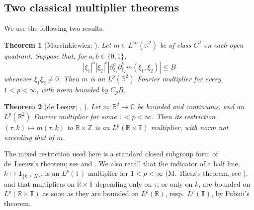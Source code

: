\documentclass[11pt,a4paper,reqno,backref=page]{amsart}
\newcommand{\R}{\mathbb R}
\newcommand{\Z}{\mathbb Z}
\newcommand{\C}{\mathbb C}
\newcommand{\T}{\mathbb T}
\newcommand{\ind}{\mathbf 1}
\numberwithin{equation}{section}
\newtheorem{theorem}{Theorem}[section]
\theoremstyle{definition}
\theoremstyle{remark}
\begin{document}
\subsection{Two classical multiplier theorems}
We use the following two results.

\begin{theorem}[Marcinkiewicz;
{\cite[\S6.2]{Grafakos2014}}]\label{thm:marcinkiewicz}
Let $m\in L^\infty(\R^2)$ be of class $C^2$ on each open
quadrant. Suppose that, for $a,b\in\{0,1\}$,
\begin{equation}\label{eq:marcinkiewicz}
  |\xi_1|^a|\xi_2|^b
  |\partial_{\xi_1}^a\partial_{\xi_2}^b m(\xi_1,\xi_2)|\le B
\end{equation}
whenever $\xi_1\xi_2\ne0$. Then $m$ is an $L^p(\R^2)$ Fourier
multiplier for every $1<p<\infty$, with norm bounded by $C_pB$.
\end{theorem}

\begin{theorem}[de Leeuw; {\cite{deLeeuw1965},
\cite{Saeki1970}}]\label{thm:deleeuw}
Let $m:\R^2\to\C$ be bounded and continuous, and an $L^p(\R^2)$
Fourier multiplier for some $1<p<\infty$. Then its restriction
$(\tau,k)\mapsto m(\tau,k)$ to $\R\times\Z$ is an
$L^p(\R\times\T)$ multiplier, with norm not exceeding that of
$m$.
\end{theorem}

The mixed restriction used here is a standard closed subgroup
form of de~Leeuw's theorem; see \cite{deLeeuw1965} and
\cite[Corollary~4.6]{Saeki1970}. We also recall that the
indicator of a half line, $k\mapsto\ind_{\{k\ge K\}}$, is an
$L^p(\T)$ multiplier for $1<p<\infty$ (M.~Riesz's theorem, see
\cite[Ch.~4]{Grafakos2014}), and that multipliers on
$\R\times\T$ depending only on $\tau$, or only on $k$, are
bounded on $L^p(\R\times\T)$ as soon as they are bounded on
$L^p(\R)$, resp.\ $L^p(\T)$, by Fubini's theorem.
\end{document}
